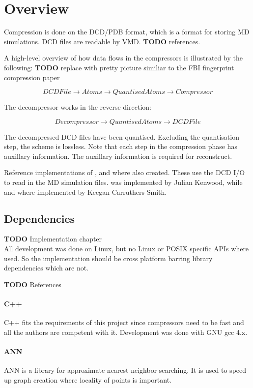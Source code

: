 \documentclass{report}
\newcommand{\todo}{\textbf{TODO} }
\begin{document}
\section{Overview}

Compression is done on the DCD/PDB format, which is a format for storing MD
simulations. DCD files are readable by VMD. \todo references.

A high-level overview of how data flows in the compressors is illustrated by
the following: \todo replace with pretty picture similiar to the FBI
fingerprint compression paper

\[ DCDFile \to Atoms \to QuantisedAtoms \to Compressor \]

The decompressor works in the reverse direction:

\[ Decompressor \to QuantisedAtoms \to DCDFile \]

The decompressed DCD files have been quantised. Excluding the quantisation
step, the scheme is lossless. Note that each step in the compression phase has
auxillary information. The auxillary information is required for reconstruct.

Reference implementations of \citet{devillers2000gci}, \citet{gumholdcomp} and
\citet{omeltchenko2000sls} where also created. These use the DCD I/O to read
in the MD simulation files. \citet{omeltchenko2000sls} was implemented by
Julian Kenwood, while \cite{devillers2000gci} and \cite{gumholdcomp} where
implemented by Keegan Carruthers-Smith.


\subsection{Dependencies}

\todo Implementation chapter \\

All development was done on Linux, but no Linux or POSIX specific APIs where
used. So the implementation should be cross platform barring library
dependencies which are not.

\todo References

\paragraph{C++}
C++ fits the requirements of this project since compressors need to be fast
and all the authors are competent with it. Development was done with GNU gcc
4.x.

\paragraph{ANN}
ANN is a library for approximate nearest neighbor searching. It is used to
speed up graph creation where locality of points is important.
\end{document}
